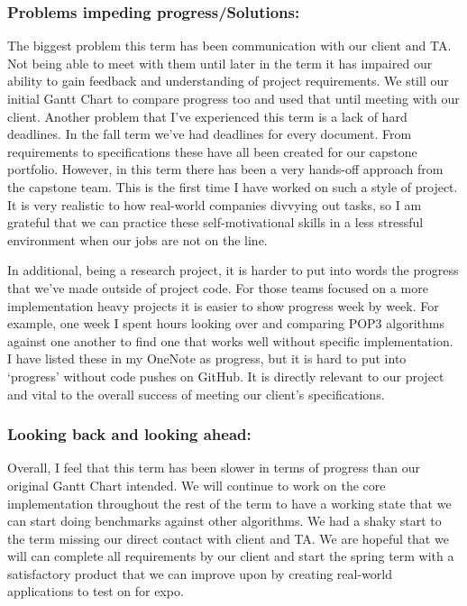 \documentclass[onecolumn, draftclsnofoot,10pt, compsoc]{IEEEtran}
\begin{document}
\subsubsection{Problems impeding progress/Solutions:}       
The biggest problem this term has been communication with our client and TA. Not being able to meet with them until later in the term it has impaired our ability to gain feedback and understanding of project requirements. We still our initial Gantt Chart to compare progress too and used that until meeting with our client. Another problem that I’ve experienced this term is a lack of hard deadlines. In the fall term we’ve had deadlines for every document. From requirements to specifications these have all been created for our capstone portfolio. However, in this term there has been a very hands-off approach from the capstone team. This is the first time I have worked on such a style of project. It is very realistic to how real-world companies divvying out tasks, so I am grateful that we can practice these self-motivational skills in a less stressful environment when our jobs are not on the line.

In additional, being a research project, it is harder to put into words the progress that we’ve made outside of project code. For those teams focused on a more implementation heavy projects it is easier to show progress week by week. For example, one week I spent hours looking over and comparing POP3 algorithms against one another to find one that works well without specific implementation. I have listed these in my OneNote as progress, but it is hard to put into ‘progress’ without code pushes on GitHub. It is directly relevant to our project and vital to the overall success of meeting our client’s specifications.


\subsubsection{Looking back and looking ahead:} 
Overall, I feel that this term has been slower in terms of progress than our original Gantt Chart intended. We will continue to work on the core implementation throughout the rest of the term to have a working state that we can start doing benchmarks against other algorithms. We had a shaky start to the term missing our direct contact with client and TA. We are hopeful that we will can complete all requirements by our client and start the spring term with a satisfactory product that we can improve upon by creating real-world applications to test on for expo.
\end{document}
